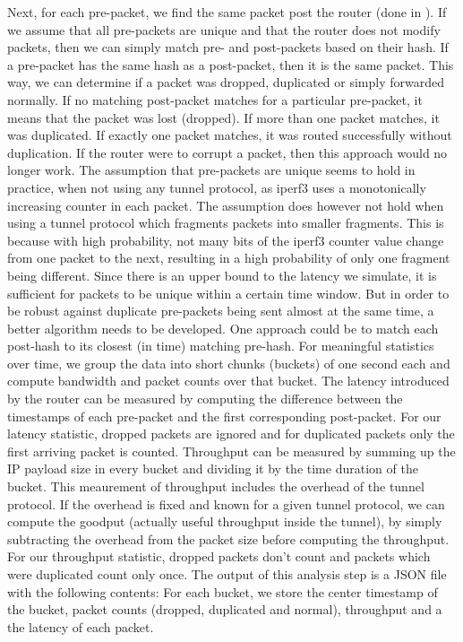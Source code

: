 Next, for each pre-packet, we find the same packet post the router (done in ).
If we assume that all pre-packets are unique and that the router does not modify packets, then we can simply match pre- and post-packets based on their hash.
If a pre-packet has the same hash as a post-packet, then it is the same packet.
This way, we can determine if a packet was dropped, duplicated or simply forwarded normally.
If no matching post-packet matches for a particular pre-packet, it means that the packet was lost (dropped).
If more than one packet matches, it was duplicated.
If exactly one packet matches, it was routed successfully without duplication.
If the router were to corrupt a packet, then this approach would no longer work.
The assumption that pre-packets are unique seems to hold in practice, when not using any tunnel protocol, as iperf3 uses a monotonically increasing counter in each packet.
The assumption does however not hold when using a tunnel protocol which fragments packets into smaller fragments.
This is because with high probability, not many bits of the iperf3 counter value change from one packet to the next, resulting in a high probability of only one fragment being different.
Since there is an upper bound to the latency we simulate, it is sufficient for packets to be unique within a certain time window.
But in order to be robust against duplicate pre-packets being sent almost at the same time, a better algorithm needs to be developed.
One approach could be to match each post-hash to its closest (in time) matching pre-hash.
For meaningful statistics over time, we group the data into short chunks (buckets) of one second each and compute bandwidth and packet counts over that bucket.
The latency introduced by the router can be measured by computing the difference between the timestamps of each pre-packet and the first corresponding post-packet.
For our latency statistic, dropped packets are ignored and for duplicated packets only the first arriving packet is counted.
Throughput can be measured by summing up the IP payload size in every bucket and dividing it by the time duration of the bucket.
This meaurement of throughput includes the overhead of the tunnel protocol.
If the overhead is fixed and known for a given tunnel protocol, we can compute the goodput (actually useful throughput inside the tunnel), by simply subtracting the overhead from the packet size before computing the throughput.
For our throughput statistic, dropped packets don't count and packets which were duplicated count only once.
The output of this analysis step is a JSON file with the following contents:
For each bucket, we store the center timestamp of the bucket, packet counts (dropped, duplicated and normal), throughput and a the latency of each packet.

